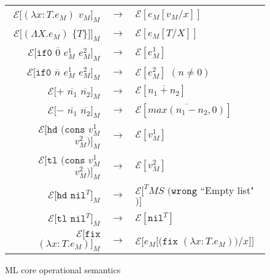 \begin{figure}
\label{mcos}
\caption{ML core operational semantics}
\onehalfspacing
\begin{center}
\begin{tabular}{rcl}
$\mathscr{E}[(\lambda x:T.e_{M})$ $v_{M}]_{M}$ & $\rightarrow$ & $\mathscr{E}[e_{M}[v_{M}/x]]$ \\
$\mathscr{E}[(\Lambda X.e_{M})$ $\lbrace T\rbrace]]_{M}$ & $\rightarrow$ & $\mathscr{E}[e_{M}[T/X]]$ \\
$\mathscr{E}[\mathtt{if0}$ $\overline{0}$ $e_{M}^{1}$ $e_{M}^{2}]_{M}$ & $\rightarrow$ & $\mathscr{E}[e_{M}^{1}]$ \\
$\mathscr{E}[\mathtt{if0}$ $\overline{n}$ $e_{M}^{1}$ $e_{M}^{2}]_{M}$ & $\rightarrow$ & $\mathscr{E}[e_{M}^{2}]$ $(n\neq0)$ \\
$\mathscr{E}[+$ $\overline{n_{1}}$ $\overline{n_{2}}]_{M}$ & $\rightarrow$ & $\mathscr{E}[\overline{n_{1}+n_{2}}]$ \\
$\mathscr{E}[-$ $\overline{n_{1}}$ $\overline{n_{2}}]_{M}$ & $\rightarrow$ & $\mathscr{E}[\overline{max(n_{1}-n_{2},0)}]$ \\
$\mathscr{E}[\mathtt{hd}$ $(\mathtt{cons}$ $v_{M}^{1}$ $v_{M}^{2})]_{M}$ & $\rightarrow$ & $\mathscr{E}[v_{M}^{1}]$ \\
$\mathscr{E}[\mathtt{tl}$ $(\mathtt{cons}$ $v_{M}^{1}$ $v_{M}^{2})]_{M}$ & $\rightarrow$ & $\mathscr{E}[v_{M}^{2}]$ \\
$\mathscr{E}[\mathtt{hd}$ $\mathtt{nil}^{T}]_{M}$ & $\rightarrow$ & $\mathscr{E}[^{T}MS$ $(\mathtt{wrong}$ ``Empty list"$)]$ \\
$\mathscr{E}[\mathtt{tl}$ $\mathtt{nil}^{T}]_{M}$ & $\rightarrow$ & $\mathscr{E}[\mathtt{nil}^{T}]$ \\
$\mathscr{E}[\mathtt{fix}$ $(\lambda x:T.e_{M})]_{M}$ & $\rightarrow$ & $\mathscr{E}[e_{M}[(\mathtt{fix}$ $(\lambda x:T.e_{M}))/x]]$
\end{tabular}
\end{center}
\end{figure}